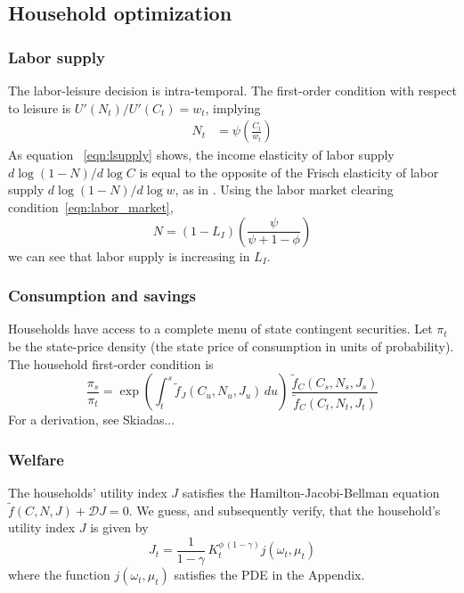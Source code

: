 \documentclass[12pt]{article}
\newcommand{\cn}{\citet}
\begin{document}
\subsection{Household optimization}

\subsubsection{Labor supply}

The labor-leisure decision is intra-temporal. The first-order condition with respect to leisure is $U'(N_t)/{U'(C_t)}  = w_t$, implying
\begin{align}
N_t & =\psi\left( \frac{C_t}{w_t}\right)\label{eqn:lsupply}
\end{align}
As equation~ \eqref{eqn:lsupply}  shows, the income elasticity of labor supply $d \log (1-N) / d \log C$ is equal to the opposite of the Frisch elasticity of labor supply $d\log(1-N)/d\log w$, as  in \cn{KPR1988}. Using the labor market clearing condition~\eqref{eqn:labor_market},
\begin{equation}
N = (1-L_I)\left(\frac{\psi  }{\psi +  1-\phi  }\right)\label{eqn:lsupply2}
\end{equation}
we can see that   labor supply is increasing in $L_I$.

\subsubsection{Consumption and savings}

Households have access to a complete menu of state contingent securities. Let $\pi_t$ be the state-price density (the state price of consumption in units of probability). The household first-order condition is
\begin{equation}
\frac{\pi_s}{\pi_t} =\exp\left(\int_t^s \tilde f_J(C_u,N_u, J_u)\,du \right)\, \frac{ \tilde f_C(C_s, N_s, J_s)}{ \tilde f_C(C_t, N_t, J_t)}
\end{equation}
For a derivation, see Skiadas...

\subsubsection{Welfare}

The households' utility index $J$ satisfies the Hamilton-Jacobi-Bellman equation $\tilde f(C, N,J)   + \mathcal{D}  J = 0 $. We guess, and subsequently verify, that the household's utility index $J$ is given by
\begin{equation}
J_t = \frac{1}{1-\gamma} \,K_t^{\phi\,(1-\gamma)} j(\omega_t, \mu_t)
\end{equation}
where the function $j(\omega_t, \mu_t)$ satisfies the PDE in the Appendix.
\end{document}
